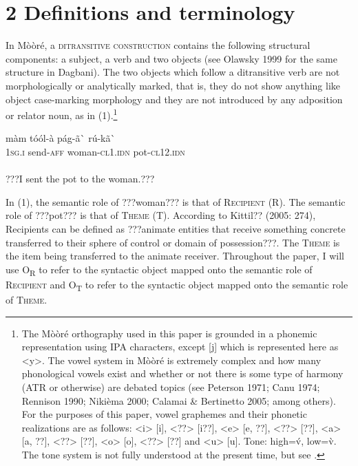 \documentclass[output=paper]{langsci/langscibook}
\begin{document}
\section{2 Definitions and terminology}

In Mòòré, a \textsc{ditransitive construction} contains the following structural components: a subject, a verb and two objects (see Olawsky 1999 for the same structure in Dagbani). The two objects which follow a ditransitive verb are not morphologically or analytically marked, that is, they do not show anything like object case-marking morphology and they are not introduced by any adposition or relator noun, as in (1).\footnote{ {The Mòòré orthography used in this paper is grounded in a phonemic representation using IPA characters, except [j] which is represented here as {\textless}y{\textgreater}. The vowel system in Mòòré is extremely complex and how many phonological vowels exist and whether or not there is some type of harmony (ATR or otherwise) are debated topics (see Peterson 1971; Canu 1974; Rennison 1990; Nikièma 2000; Calamai \& Bertinetto 2005; among others). For the purposes of this paper, vowel graphemes and their phonetic realizations are as follows: {\textless}i{\textgreater} [i], {\textless}??{\textgreater} [i??], {\textless}e{\textgreater} [e, ??], {\textless}??{\textgreater} [??], {\textless}a{\textgreater} [a, ??], {\textless}??{\textgreater} [??], {\textless}o{\textgreater} [o], {\textless}??{\textgreater} [??] and {\textless}u{\textgreater} [u]. Tone: high=\'{v}, low=\`{v}. The tone system is not fully understood at the present time, but see \citet{Peterson1971}.} }


\ea \gll 
\label{bkm:Ref424141523}màm    tóól-à        pág-ã\`{ }             rú-kã\`{ }\\
\textsc{1sg.i}    send-\textsc{aff}      woman-\textsc{cl1.idn}       pot-\textsc{cl12.idn}\\
\\\glt ???I sent the pot to the woman.???  
\z

In (1), the semantic role of ???woman??? is that of \textsc{Recipient} (R).  The semantic role of ???pot??? is that of \textsc{Theme} (T). According to Kittil?? (2005: 274), Recipients can be defined as ???animate entities that receive something concrete transferred to their sphere of control or domain of possession???. The \textsc{Theme} is the item being transferred to the animate receiver. Throughout the paper, I will use O\textsubscript{R} to refer to the syntactic object mapped onto the semantic role of \textsc{Recipient} and O\textsubscript{T }to refer to the syntactic object mapped onto the semantic role of \textsc{Theme}. 
\end{document}
